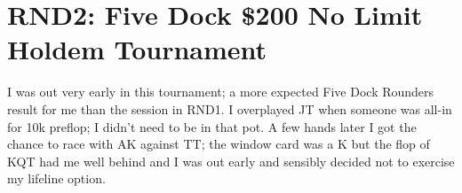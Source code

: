 \section*{RND2: Five Dock \$200 No Limit Holdem Tournament}

I was out very early in this tournament; a more expected Five Dock
Rounders result for me than the session in RND1. I overplayed JT when
someone was all-in for 10k preflop; I didn't need to be in that pot.
A few hands later I got the chance to race with AK against TT; the
window card was a K but the flop of KQT had me well behind and I was
out early and sensibly decided not to exercise my lifeline option.
